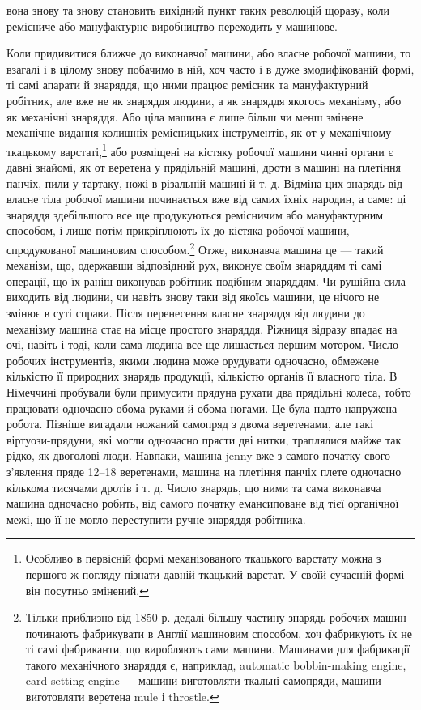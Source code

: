 \parcont{}  %
вона знову та знову становить вихідний пункт таких революцій
щоразу, коли ремісниче або мануфактурне виробництво переходить
у машинове.

Коли придивитися ближче до виконавчої машини, або власне
робочої машини, то взагалі і в цілому знову побачимо в ній, хоч
часто і в дуже змодифікованій формі, ті самі апарати й знаряддя,
що ними працює ремісник та мануфактурний робітник, але
вже не як знаряддя людини, а як знаряддя якогось механізму,
або як механічні знаряддя. Або ціла машина є лише більш
чи менш змінене механічне видання колишніх ремісницьких
інструментів, як от у механічному ткацькому варстаті,\footnote{
Особливо в первісній формі механізованого ткацького варстату
можна з першого ж погляду пізнати давній ткацький варстат. У своїй
сучасній формі він посутньо змінений.
} або
розміщені на кістяку робочої машини чинні органи є давні
знайомі, як от веретена у прядільній машині, дроти в машині
на плетіння панчіх, пили у тартаку, ножі в різальній машині
й т. д. Відміна цих знарядь від власне тіла робочої машини
починається вже від самих їхніх народин, а саме: ці знаряддя
здебільшого все ще продукуються ремісничим або мануфактурним
способом, і лише потім прикріплюють їх до кістяка
робочої машини, спродукованої машиновим способом.\footnote{
Тільки приблизно від 1850 р. дедалі більшу частину знарядь робочих
машин починають фабрикувати в Англії машиновим способом, хоч
фабрикують їх не ті самі фабриканти, що виробляють сами машини.
Машинами для фабрикації такого механічного знаряддя є, наприклад,
automatic bobbin-making engine, card-setting engine — машини виготовляти
ткальні самопряди, машини виготовляти веретена mule і throstle.
} Отже,
виконавча машина це — такий механізм, що, одержавши відповідний
рух, виконує своїм знаряддям ті самі операції, що їх раніш
виконував робітник подібним знаряддям. Чи рушійна сила виходить
від людини, чи навіть знову таки від якоїсь машини, це
нічого не змінює в суті справи. Після перенесення власне знаряддя
від людини до механізму машина стає на місце простого знаряддя.
Ріжниця відразу впадає на очі, навіть і тоді, коли сама людина
все ще лишається першим мотором. Число робочих інструментів,
якими людина може орудувати одночасно, обмежене кількістю
її природних знарядь продукції, кількістю органів її власного
тіла. В Німеччині пробували були примусити прядуна рухати
два прядільні колеса, тобто працювати одночасно обома руками
й обома ногами. Це була надто напружена робота. Пізніше вигадали
ножаний самопряд з двома веретенами, але такі віртуози-прядуни,
які могли одночасно прясти дві нитки, траплялися майже
так рідко, як двоголові люди. Навпаки, машина jenny вже з
самого початку свого з’явлення пряде 12--18 веретенами, машина
на плетіння панчіх плете одночасно кількома тисячами дротів і
т. д. Число знарядь, що ними та сама виконавча машина одночасно
робить, від самого початку емансиповане від тієї органічної
межі, що її не могло переступити ручне знаряддя робітника.
